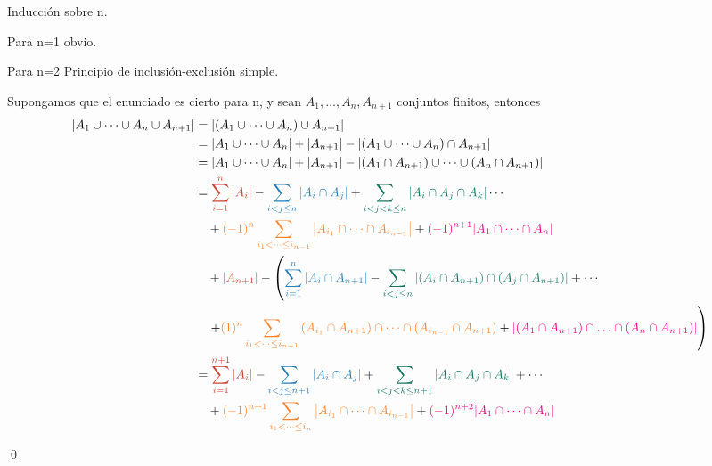 		\begin{demostration}
			Inducción sobre n.
			
			Para n=1 obvio.
			
			Para n=2 Principio de inclusión-exclusión simple.
			
			Supongamos que el enunciado es cierto para n, y sean $A_1,\dotso,A_n,A_{n+1}$ conjuntos finitos, entonces
			\begin{align*}
				\abs{A_1\cup\dotsb\cup A_n\cup A_{n+1}}&=\abs{(A_1\cup\dotsb\cup A_n)\cup A_{n+1}} \\
				&=\abs{A_1\cup\dotsb\cup A_n}+\abs{A_{n+1}}-\abs{(A_1\cup\dotsb\cup A_n)\cap A_{n+1}} \\
				&=\abs{A_1\cup\dotsb\cup A_n}+\abs{A_{n+1}}-\abs{(A_1\cap A_{n+1})\cup\dotsb\cup(A_n\cap A_{n+1})}\\
				&= \textcolor{Rojop}{\sum_{i=1}^{n}{\abs{A_i}}}
				-\textcolor{Azulp}{\sum_{i< j\leq n}{\abs{A_i\cap A_j}}}
				+\textcolor{Verdep}{\sum_{i< j< k\leq n}{\abs{A_i\cap A_j\cap A_k}}}\dotsb\\
				&\quad+\textcolor{ORANGEmanim}{(-1)^n\sum_{i_1< \dotsb\leq i_{n-1}}{\abs{A_{i_1}\cap\dotsb\cap A_{i_{n-1}}}}}
				+\textcolor{magenta}{(-1)^{n+1}\abs{A_1\cap\dotsb\cap A_n}}\\
				&\quad+\textcolor{Rojop}{\abs{A_{n+1}}}
				-\left(\textcolor{Azulp}{\sum_{i=1}^{n}{\abs{A_i\cap A_{n+1}}}}
				-\textcolor{Verdep}{\sum_{i<j\le n}{\abs{(A_i\cap A_{n+1})\cap(A_j\cap A_{n+1})}}}+\dotsb\right.\\
				&\quad\left.+\textcolor{ORANGEmanim}{(1)^{n}\sum_{i_1<\dotsb\leq i_{n-1}}{(A_{i_1}\cap A_{n+1})\cap\dotsb\cap(A_{i_{n-1}}\cap A_{n+1})}}
				+\textcolor{magenta}{\abs{(A_1\cap A_{n+1})\cap\dotso\cap(A_n\cap A_{n+1})}}\right)\\
				&=\textcolor{Rojop}{\sum_{i=1}^{n+1}{\abs{A_i}}}
				-\textcolor{Azulp}{\sum_{i<j\le n+1}{\abs{A_i\cap A_j}}}
				+\textcolor{Verdep}{\sum_{i< j< k\leq n+1}{\abs{A_i\cap A_j\cap A_k}}}+\dotsb\\
				&\quad+\textcolor{ORANGEmanim}{(-1)^{n+1}\sum_{i_1< \dotsb\leq i_{n}}{\abs{A_{i_1}\cap\dotsb\cap A_{i_{n-1}}}}}
				+\textcolor{magenta}{(-1)^{n+2}\abs{A_1\cap\dotsb\cap A_n}}
			\end{align*}
			\begin{flushright}
				\qed
			\end{flushright}
		\end{demostration}

